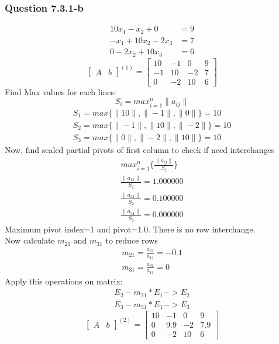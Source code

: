 \documentclass{article}
\begin{document}
\subsubsection{Question 7.3.1-b}
\begin{align}
\label{q7.3.1.b.1}10x_{1}-x_{2}+0&=9 \\
\label{q7.3.1.b.2}-x_{1}+10x_{2}-2x_{3}&=7 \\
\label{q7.3.1.b.3}0-2x_{2}+10x_{3}&=6
\end{align}
\[
\left[
\begin{array}{c|c}
A&b
\end{array}
\right]^{(1)}
=
\left[
\begin{array}{ccc|c}
	10&-1&0&9\\
	-1&10&-2&7\\
	0&-2&10&6 
\end{array}
\right]
\]
Find Max values for each lines: 
\begin{equation}
\label{findSMax3}S_{i}=max_{i=1}^n\|a_{ij}\|
\end{equation}
\begin{align}
	S_{1}=max\{\|10\|,\|-1\|,\|0\|\}=10\\
	S_{2}=max\{\|-1\|,\|10\|,\|-2\|\}=10\\
	S_{3}=max\{\|0\|,\|-2\|,\|10\|\}=10
\end{align}
Now, find scaled partial pivots of first column to check if need interchanges
\begin{align}
	max_{i=1}^n\{\frac{\|a_{ij}\|}{S_{i}}\}\\
	\frac{\|a_{11}\|}{S_{1}}=1.000000\\
	\frac{\|a_{21}\|}{S_{2}}=0.100000\\
	\frac{\|a_{31}\|}{S_{3}}=0.000000
\end{align}
Maximum pivot index=1 and pivot=1.0. There is no row interchange.\\
Now calculate $m_{21}$ and $m_{31}$ to reduce rows 
\begin{align}
	m_{21}=\frac{a_{21}}{a_{11}}=-0.1\\
	m_{31}=\frac{a_{31}}{a_{11}}=0
\end{align}
Apply this operations on matrix:
\begin{align}
	E_{2}-m_{21}*E_{1}->E_{2}\\
	E_{3}-m_{31}*E_{1}->E_{3}
\end{align}
\[
\left[
\begin{array}{c|c}
A&b
\end{array}
\right]^{(2)}
=
\left[
\begin{array}{ccc|c}
	10&-1&0&9\\
	0&9.9&-2&7.9\\
	0&-2&10&6 
\end{array}
\right]
\]
\end{document}
